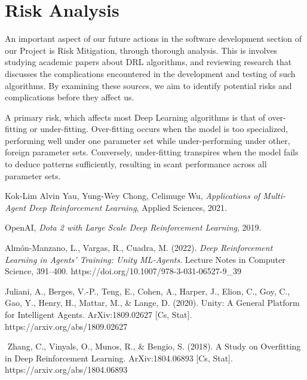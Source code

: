 \documentclass{article}
\begin{document}
\section{Risk Analysis}
\hspace{2em}An important aspect of our future actions in the software development section of our Project is Risk Mitigation, through thorough analysis. This is involves studying academic papers about DRL algorithms, and reviewing research that discusses the complications encountered in the development and testing of such algorithms. By examining these sources, we aim to identify potential risks and complications before they affect us.

\hspace{2em}A primary risk, which affects most Deep Learning algorithms is that of over-fitting or under-fitting\cite{entry5}. Over-fitting occurs when the model is too specialized, performing well under one parameter set while under-performing under other, foreign parameter sets. Conversely, under-fitting transpires when the model fails to deduce patterns sufficiently, resulting in scant performance across all parameter sets.





\begin{thebibliography}{9}

Kok-Lim Alvin Yau, Yung-Wey Chong, Celimuge Wu, \textit{Applications of Multi-Agent Deep Reinforcement Learning}, Applied Sciences, 2021.

OpenAI, \textit{Dota 2 with Large Scale Deep Reinforcement Learning}, 2019.

Almón-Manzano, L., Vargas, R.,  Cuadra, M. (2022). \textit{Deep Reinforcement Learning in Agents’ Training: Unity ML-Agents}. Lecture Notes in Computer Science, 391–400. https://doi.org/10.1007/978-3-031-06527-9\_39

Juliani, A., Berges, V.-P., Teng, E., Cohen, A., Harper, J., Elion, C., Goy, C., Gao, Y., Henry, H., Mattar, M., \& Lange, D. (2020). Unity: A General Platform for Intelligent Agents. ArXiv:1809.02627 [Cs, Stat]. https://arxiv.org/abs/1809.02627

‌
Zhang, C., Vinyals, O., Munos, R., \& Bengio, S. (2018). A Study on Overfitting in Deep Reinforcement Learning. ArXiv:1804.06893 [Cs, Stat]. https://arxiv.org/abs/1804.06893

‌
‌
\end{thebibliography}
\end{document}
